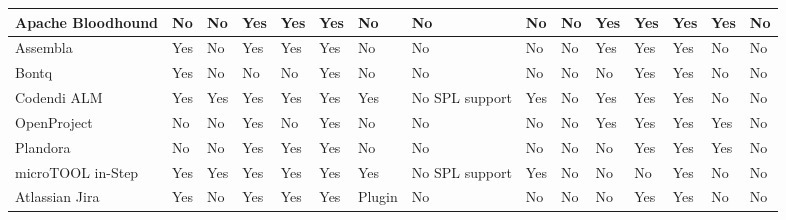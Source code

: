 \begin{landscape}
\begin{table}[!ht]
\begin{center}
\begin{tabular}{|l|l|l|l|l|l|l|l|l|l|l|l|l|l|l|}
    Apache Bloodhound         & No              & No           & Yes            & Yes                         & Yes            & No      & No             & No           & No                      & Yes                         & Yes       & Yes                & Yes         & No           \\ \hline
    Assembla                  & Yes             & No           & Yes            & Yes                         & Yes            & No      & No             & No           & No                      & Yes                         & Yes       & Yes                & No          & No           \\ \hline
    Bontq                     & Yes             & No           & No             & No                          & Yes            & No      & No             & No           & No                      & No                          & Yes       & Yes                & No          & No           \\ \hline
    Codendi ALM               & Yes             & Yes          & Yes            & Yes                         & Yes            & Yes     & No SPL support & Yes          & No                      & Yes                         & Yes       & Yes                & No          & No           \\ \hline
    OpenProject               & No              & No           & Yes            & No                          & Yes            & No      & No             & No           & No                      & Yes                         & Yes       & Yes                & Yes         & No           \\ \hline
    Plandora                  & No              & No           & Yes            & Yes                         & Yes            & No      & No             & No           & No                      & No                          & Yes       & Yes                & Yes         & No           \\ \hline
    microTOOL in-Step         & Yes             & Yes          & Yes            & Yes                         & Yes            & Yes     & No SPL support & Yes          & No                      & No                          & No        & Yes                & No          & No           \\ \hline
    Atlassian Jira            & Yes             & No           & Yes            & Yes                         & Yes            & Plugin  & No             & No           & No                      & No                          & Yes       & Yes                & No          & No           \\ \hline

\end{tabular}
\end{center}
\end{table}
\end{landscape}
